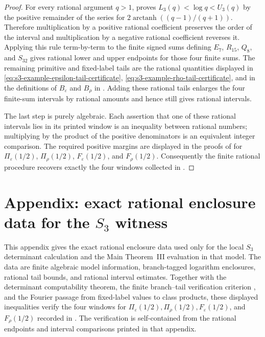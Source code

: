 \documentclass[11pt,a4paper]{amsart}
\theoremstyle{plain}
\theoremstyle{definition}
\theoremstyle{remark}
\begin{document}
\begin{proof}
  For every rational argument \(q>1\),
   proves
  \(L_3(q)<\log q<U_3(q)\) by the positive remainder of the series for
  \(2\operatorname{arctanh}((q-1)/(q+1))\).  Therefore multiplication by a
  positive rational coefficient preserves the order of the interval and
  multiplication by a negative rational coefficient reverses it.  Applying this
  rule term-by-term to the finite signed sums defining
  \(E_7\), \(R_{15}\), \(Q_8\), and \(S_{32}\) gives rational lower and upper
  endpoints for those four finite sums.  The remaining primitive and
  fixed-label tails are the rational quantities displayed in
  \eqref{eq:s3-example-epsilon-tail-certificate},
  \eqref{eq:s3-example-rho-tail-certificate}, and in the definitions of
  \(B_\varepsilon\) and \(B_\rho\) in
  .  Adding these rational tails
  enlarges the four finite-sum intervals by rational amounts and hence still
  gives rational intervals.

  The last step is purely algebraic.  Each assertion that one of these rational
  intervals lies in its printed window is an inequality between rational
  numbers; multiplying by the product of the positive denominators is an
  equivalent integer comparison.  The required positive margins are displayed in
  the proofs of
  for \(\Pi_\varepsilon(1/2)\), \(\Pi_\rho(1/2)\),
  \(F_\varepsilon(1/2)\), and \(F_\rho(1/2)\).  Consequently the finite rational
  procedure recovers exactly the four windows collected in
  .
\end{proof}

\section{Appendix: exact rational enclosure data for the \texorpdfstring{\(S_3\)}{S3} witness}
\label{app:fixed-label-local-certificates}

This appendix gives the exact rational enclosure data used only for the local
\(S_3\) determinant calculation and the Main Theorem~III evaluation in that
model.  The data are finite algebraic model information, branch-tagged
logarithm enclosures, rational tail bounds, and rational interval estimates.
Together with the determinant computability theorem, the finite branch--tail
verification criterion , and the
Fourier passage from fixed-label values to class products, these displayed
inequalities verify the four windows for
\(\Pi_\varepsilon(1/2),\Pi_\rho(1/2),F_\varepsilon(1/2)\), and
\(F_\rho(1/2)\) recorded in
.  The verification is
self-contained from the rational endpoints and interval comparisons printed in
that appendix.
\end{document}
